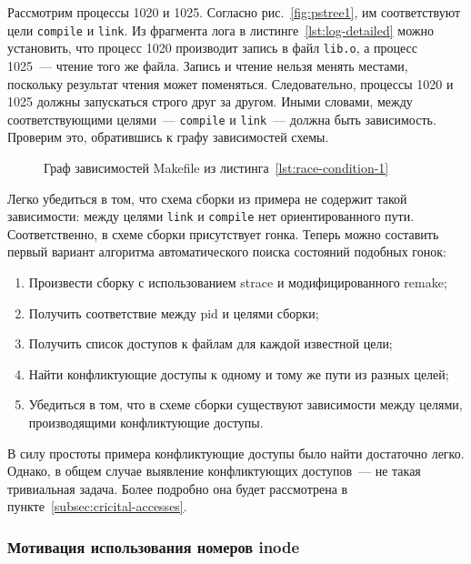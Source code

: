 Рассмотрим процессы 1020 и 1025. Согласно рис.~\ref{fig:pstree1}, им соответствуют цели \texttt{compile} и \texttt{link}. Из фрагмента лога в листинге~\ref{lst:log-detailed} можно установить, что процесс 1020 производит запись в файл \texttt{lib.o}, а процесс 1025~--- чтение того же файла. Запись и чтение нельзя менять местами, поскольку результат чтения может поменяться. Следовательно, процессы 1020 и 1025 должны запускаться строго друг за другом. Иными словами, между соответствующими целями~--- \texttt{compile} и \texttt{link}~--- должна быть зависимость. Проверим это, обратившись к графу зависимостей схемы.

\begin{figure}[H]
	\centering
	
    \caption{Граф зависимостей Makefile из листинга~\ref{lst:race-condition-1}}
    \label{fig:dependency-graph}
\end{figure}

Легко убедиться в том, что схема сборки из примера не содержит такой зависимости: между целями \texttt{link} и \texttt{compile} нет ориентированного пути. Соответственно, в схеме сборки присутствует гонка. Теперь можно составить первый вариант алгоритма автоматического поиска состояний подобных гонок:

\begin{enumerate}
	\item Произвести сборку с использованием strace и модифицированного remake;
	\item Получить соответствие между pid и целями сборки;
	\item Получить список доступов к файлам для каждой известной цели;
	\item Найти конфликтующие доступы к одному и тому же пути из разных целей;
	\item Убедиться в том, что в схеме сборки существуют зависимости между целями, производящими конфликтующие доступы.
\end{enumerate}

В силу простоты примера конфликтующие доступы было найти достаточно легко. Однако, в общем случае выявление конфликтующих доступов~--- не такая тривиальная задача. Более подробно она будет рассмотрена в пункте~\ref{subsec:cricital-accesses}.

\subsubsection{Мотивация использования номеров inode}
\label{subsubsec:why-inodes}

